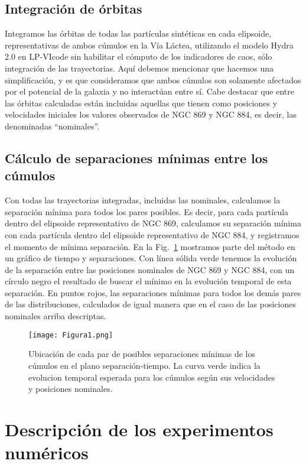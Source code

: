 \documentclass[baaa]{baaa}
\begin{document}
\subsection{Integración de \'orbitas} 
Integramos las órbitas de todas las partículas sintéticas en cada elipsoide, representativas de ambos c\'umulos en la Vía Láctea, utilizando el modelo {\sc Hydra 2.0} en {\sc LP-VIcode} sin habilitar el c\'omputo de los indicadores de caos, s\'olo integración de las trayectorias. Aqu\'i debemos mencionar que hacemos una simplificaci\'on, y es que consideramos que ambos c\'umulos son solamente afectados por el potencial de la galaxia y no interact\'uan entre s\'i.  Cabe destacar que entre las \'orbitas calculadas est\'an incluidas aquellas que tienen como posiciones y velocidades iniciales los valores observados de NGC 869 y NGC 884, es decir, las denominadas “nominales”.


\subsection{Cálculo de separaciones mínimas entre los c\'umulos} 
Con todas las trayectorias integradas, incluidas las nominales, calculamos la separación mínima para todos los pares posibles. Es decir, para cada partícula dentro del elipsoide representativo de NGC 869, calculamos su separación mínima con cada partícula dentro del elipsoide representativo de NGC 884, y registramos el momento de m\'inima separaci\'on. En la Fig.~\ref{Figura1} mostramos parte del método en un gráfico de tiempo y separaciones. Con línea sólida verde tenemos la evolución de la separación entre las posiciones nominales de NGC 869 y NGC 884, con un círculo negro el resultado de buscar el mínimo en la evolución temporal de esta separación. En puntos rojos, las separaciones mínimas para todos los demás pares de las distribuciones, calculados de igual manera que en el caso de las posiciones nominales arriba descriptas.  
\begin{figure}[!t]
\centering
\texttt{[image: Figura1.png]}
\caption{Ubicaci\'on de cada par de posibles separaciones m\'inimas de los c\'umulos en el plano separaci\'on-tiempo. La curva verde indica la evolucion temporal esperada para los c\'umulos seg\'un sus velocidades y posiciones nominales.}
\label{Figura1}
\end{figure}


\section{Descripci\'on de los experimentos num\'ericos}
\end{document}
